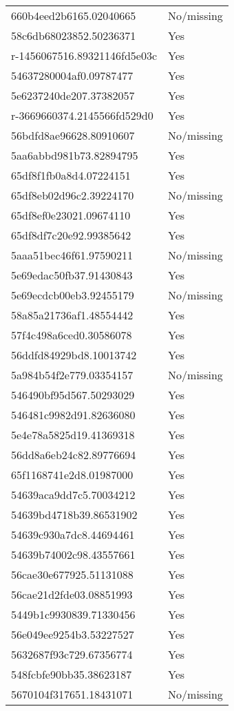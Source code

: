 \begin{tabular}{ll}
660b4eed2b6165.02040665 & No/missing \\
58c6db68023852.50236371 & Yes \\
r-1456067516.89321146fd5e03c & Yes \\
54637280004af0.09787477 & Yes \\
5e6237240de207.37382057 & Yes \\
r-3669660374.2145566fd529d0 & Yes \\
56bdfd8ae96628.80910607 & No/missing \\
5aa6abbd981b73.82894795 & Yes \\
65df8f1fb0a8d4.07224151 & Yes \\
65df8eb02d96c2.39224170 & No/missing \\
65df8ef0e23021.09674110 & Yes \\
65df8df7c20e92.99385642 & Yes \\
5aaa51bec46f61.97590211 & No/missing \\
5e69edac50fb37.91430843 & Yes \\
5e69ecdcb00eb3.92455179 & No/missing \\
58a85a21736af1.48554442 & Yes \\
57f4c498a6ced0.30586078 & Yes \\
56ddfd84929bd8.10013742 & Yes \\
5a984b54f2e779.03354157 & No/missing \\
546490bf95d567.50293029 & Yes \\
546481c9982d91.82636080 & Yes \\
5e4e78a5825d19.41369318 & Yes \\
56dd8a6eb24c82.89776694 & Yes \\
65f1168741e2d8.01987000 & Yes \\
54639aca9dd7c5.70034212 & Yes \\
54639bd4718b39.86531902 & Yes \\
54639c930a7dc8.44694461 & Yes \\
54639b74002c98.43557661 & Yes \\
56cae30e677925.51131088 & Yes \\
56cae21d2fde03.08851993 & Yes \\
5449b1c9930839.71330456 & Yes \\
56e049ee9254b3.53227527 & Yes \\
5632687f93c729.67356774 & Yes \\
548fcbfe90bb35.38623187 & Yes \\
5670104f317651.18431071 & No/missing \\

\end{tabular}
